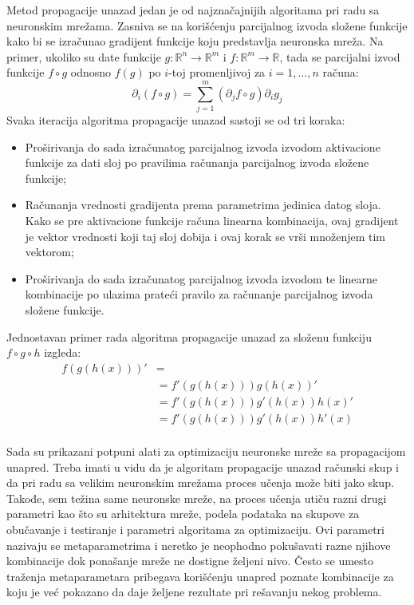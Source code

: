 Metod propagacije unazad jedan je od najznačajnijih algoritama pri radu sa neuronskim mrežama. Zasniva se na korišćenju parcijalnog izvoda složene funkcije kako bi se izračunao gradijent funkcije koju predstavlja neuronska mreža. Na primer, ukoliko su date funkcije $g: \mathbb{R}^n \rightarrow \mathbb{R}^m$ i $f: \mathbb{R}^m \rightarrow \mathbb{R}$, tada se parcijalni izvod funkcije $f \circ g $ odnosno $f(g)$ po $i$-toj promenljivoj za $i=1,...,n$ računa:
\begin{equation}
	\partial_i (f \circ g) = \sum_{j=1}^{m} (\partial_j f \circ g) \partial_i g_j 
\end{equation}
Svaka iteracija algoritma propagacije unazad sastoji se od tri koraka:
\begin{itemize}
	\item Proširivanja do sada izračunatog parcijalnog izvoda izvodom aktivacione funkcije za dati sloj po pravilima računanja parcijalnog izvoda složene funkcije;
	\item Računanja vrednosti gradijenta prema parametrima jedinica datog sloja. Kako se pre aktivacione funkcije računa linearna kombinacija, ovaj gradijent je vektor vrednosti koji taj sloj dobija i ovaj korak se vrši množenjem tim vektorom;
	\item Proširivanja do sada izračunatog parcijalnog izvoda izvodom te linearne kombinacije po ulazima prateći pravilo za računanje parcijalnog izvoda složene funkcije.
\end{itemize}

Jednostavan primer rada algoritma propagacije unazad za složenu funkciju $f \circ g \circ h$ izgleda:
\begin{equation}
	\begin{aligned}
		f(g(h(x)))' &= \\
		&= f'(g(h(x)))g(h(x))' \\ 
		&= f'(g(h(x)))g'(h(x))h(x)' \\ 
		&= f'(g(h(x)))g'(h(x))h'(x) \\
	\end{aligned}
\end{equation}

Sada su prikazani potpuni alati za optimizaciju neuronske mreže sa propagacijom unapred. Treba imati u vidu da je algoritam propagacije unazad računski skup i da pri radu sa velikim neuronskim mrežama proces učenja može biti jako skup. Takođe, sem težina same neuronske mreže, na proces učenja utiču razni drugi parametri kao što su arhitektura mreže, podela podataka na skupove za obučavanje i testiranje i parametri algoritama za optimizaciju. Ovi parametri nazivaju se metaparametrima i neretko je neophodno pokušavati razne njihove kombinacije dok ponašanje mreže ne dostigne željeni nivo. Često se umesto traženja metaparametara pribegava korišćenju unapred poznate kombinacije za koju je već pokazano da daje željene rezultate pri rešavanju nekog problema.

